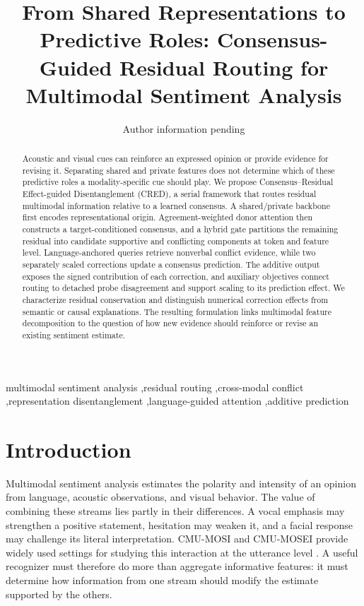 \documentclass[review,12pt]{elsarticle}
\begin{document}
\begin{frontmatter}
\title{From Shared Representations to Predictive Roles: Consensus-Guided Residual Routing for Multimodal Sentiment Analysis}
\author{Author information pending}
\address{Affiliations and corresponding author to be supplied}
\begin{abstract}
Acoustic and visual cues can reinforce an expressed opinion or provide evidence for revising it. Separating shared and private features does not determine which of these predictive roles a modality-specific cue should play. We propose Consensus--Residual Effect-guided Disentanglement (CRED), a serial framework that routes residual multimodal information relative to a learned consensus. A shared/private backbone first encodes representational origin. Agreement-weighted donor attention then constructs a target-conditioned consensus, and a hybrid gate partitions the remaining residual into candidate supportive and conflicting components at token and feature level. Language-anchored queries retrieve nonverbal conflict evidence, while two separately scaled corrections update a consensus prediction. The additive output exposes the signed contribution of each correction, and auxiliary objectives connect routing to detached probe disagreement and support scaling to its prediction effect. We characterize residual conservation and distinguish numerical correction effects from semantic or causal explanations. The resulting formulation links multimodal feature decomposition to the question of how new evidence should reinforce or revise an existing sentiment estimate.
\end{abstract}
\begin{keyword}
multimodal sentiment analysis \sep residual routing \sep cross-modal conflict
\sep representation disentanglement \sep language-guided attention \sep additive prediction
\end{keyword}
\end{frontmatter}

\section{Introduction}
Multimodal sentiment analysis estimates the polarity and intensity of an opinion from language, acoustic observations, and visual behavior. The value of combining these streams lies partly in their differences. A vocal emphasis may strengthen a positive statement, hesitation may weaken it, and a facial response may challenge its literal interpretation. CMU-MOSI and CMU-MOSEI provide widely used settings for studying this interaction at the utterance level \cite{mosi,mosei}. A useful recognizer must therefore do more than aggregate informative features: it must determine how information from one stream should modify the estimate supported by the others.
\end{document}
